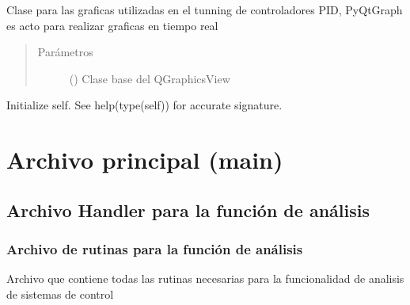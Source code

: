 \documentclass[letterpaper,10pt,spanish]{sphinxmanual}
\begin{document}
\begin{fulllineitems}
\label{\detokenize{codigos/Promociones:pyqtgraphWidget.PgraphWidgetpid}}
Clase para las graficas utilizadas en el tunning de controladores PID, PyQtGraph es acto para realizar graficas en tiempo real
\begin{quote}\begin{description}
\item[{Parámetros}] \leavevmode
{} () \textendash{} Clase base del QGraphicsView

\end{description}\end{quote}

\begin{fulllineitems}
\label{\detokenize{codigos/Promociones:pyqtgraphWidget.PgraphWidgetpid.__init__}}
Initialize self.  See help(type(self)) for accurate signature.

\end{fulllineitems}


\end{fulllineitems}



\chapter{Archivo principal (main)}
\label{\detokenize{codigos/Principal:archivo-principal-main}}\label{\detokenize{codigos/Principal::doc}}

\section{Archivo Handler para la función de análisis}
\label{\detokenize{codigos/analisisHandler:archivo-handler-para-la-funcion-de-analisis}}\label{\detokenize{codigos/analisisHandler::doc}}

\subsection{Archivo de rutinas para la función de análisis}
\label{\detokenize{codigos/rutinas_analisis:module-rutinas_analisis}}\label{\detokenize{codigos/rutinas_analisis:archivo-de-rutinas-para-la-funcion-de-analisis}}\label{\detokenize{codigos/rutinas_analisis::doc}}
Archivo que contiene todas las rutinas necesarias para la funcionalidad de analisis de sistemas de control
\end{document}
